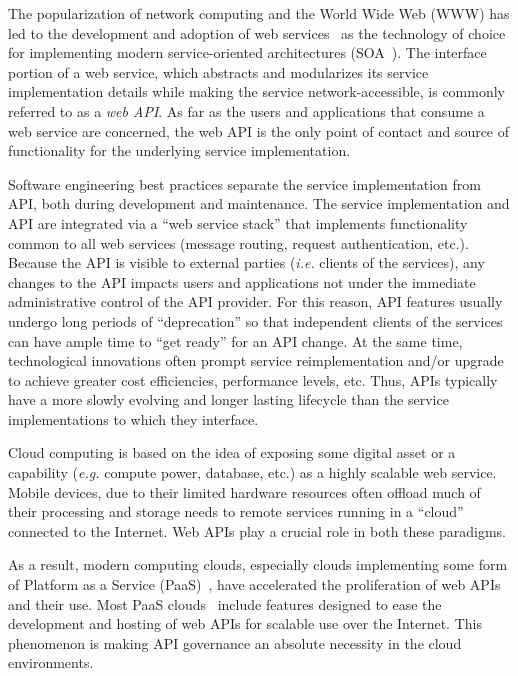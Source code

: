 The popularization of network computing and the World Wide Web (WWW) 
has led to the development and adoption of web services~\cite{6094008} as
the technology of choice for implementing modern service-oriented 
architectures (SOA~\cite{Haines:2010:SAM:1787234.1787269}).
The interface portion of a web service, which abstracts and modularizes
its service implementation
details while making the service network-accessible, is commonly referred to
as a {\em web API}. As far as the users and applications that consume a 
web service
are concerned, the web API is the only point of contact and source of
functionality for the underlying service implementation.

Software engineering best practices separate the service implementation
from API, both during development and maintenance.
The service implementation and API are integrated via 
a ``web service stack'' that implements functionality common to all web
services (message routing, request authentication, etc.).
Because the API is visible to external parties ({\em i.e.} clients of the
services), any changes to the API
impacts users and applications not under the immediate administrative control
of the API provider.  For this reason, API features 
usually undergo long
periods of ``deprecation'' so that independent clients of the services can have
ample time to ``get ready'' for an API change.  At the same time,
technological innovations often prompt service reimplementation and/or 
upgrade to
achieve greater cost efficiencies, performance levels, etc.
Thus, APIs typically have a more
slowly evolving and longer lasting lifecycle than the service
implementations
to which they interface. 

Cloud computing is based on the idea of exposing some digital asset or a
capability ({\em e.g.} compute power, database, etc.) 
as a highly scalable web service.  Mobile
devices, due to their limited hardware resources often offload much of their
processing and storage needs to remote services running in a ``cloud''
connected to the Internet.  Web APIs
play a crucial role in both these paradigms. 

As a result, modern computing clouds, especially clouds implementing some form
of Platform as a Service (PaaS)~\cite{4548165}, have accelerated the
proliferation of
web APIs and their use.  Most PaaS
clouds~\cite{appscale13,cloudfoundry,openshift} include
features designed to
ease the development and hosting of web APIs for scalable use over the Internet. 
This phenomenon is making API governance an absolute necessity in the cloud
environments.

